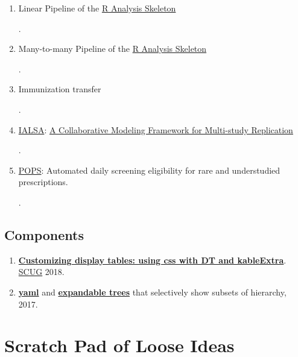 \documentclass[]{book}
\providecommand{\tightlist}{%
  \setlength{\itemsep}{0pt}\setlength{\parskip}{0pt}}
\begin{document}
\begin{enumerate}
\def\labelenumi{\arabic{enumi}.}
\item
  Linear Pipeline of the \href{https://github.com/wibeasley/RAnalysisSkeleton}{R Analysis Skeleton}

  .
\item
  Many-to-many Pipeline of the \href{https://github.com/wibeasley/RAnalysisSkeleton}{R Analysis Skeleton}

  .
\item
  Immunization transfer

  .
\item
  \href{http://www.ialsa.org/}{IALSA}: \href{https://github.com/IALSA/IALSA-2015-Portland/blob/master/pubs/2016-talks/2016-06-09-cpa/ppt/koval-etal-2016-06-10-cpa.pdf}{A Collaborative Modeling Framework for Multi-study Replication}

  .
\item
  \href{https://github.com/OuhscBbmc/darden-pharmaco-1}{POPS}: Automated daily screening eligibility for rare and understudied prescriptions.

  .
\end{enumerate}

\hypertarget{components}{%
\section{Components}\label{components}}

\begin{enumerate}
\def\labelenumi{\arabic{enumi}.}
\tightlist
\item
  \textbf{\href{https://raw.githack.com/OuhscBbmc/StatisticalComputing/master/2018-presentations/10-october/table-styling.html\#/}{Customizing display tables: using css with DT and kableExtra}}. \href{https://github.com/OuhscBbmc/StatisticalComputing}{SCUG} 2018.
\item
  \textbf{\href{https://github.com/wibeasley/class-yaml-2017/blob/master/data-public/raw/miechv-3-outcome-measure.yml}{yaml}} and \textbf{\href{https://rawcdn.githack.com/wibeasley/class-yaml-2017/55ad75a9f69b03fde929c06bb3ec129f25c816a9/analysis/miechv-3-measures/miechv-3-measures.html\#4_trees}{expandable trees}} that selectively show subsets of hierarchy, 2017.
\end{enumerate}

\hypertarget{scratch-pad}{%
\chapter{Scratch Pad of Loose Ideas}\label{scratch-pad}}
\end{document}
